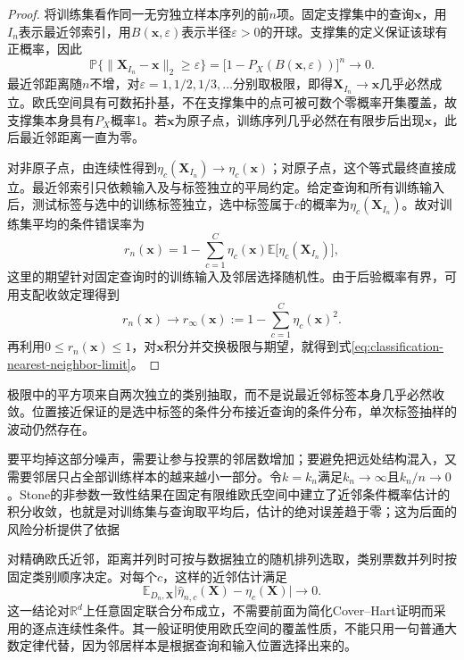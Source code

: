 \begin{proof}
  将训练集看作同一无穷独立样本序列的前$n$项。固定支撑集中的查询$\bm{x}$，用$I_n$表示最近邻索引，用$B(\bm{x},\varepsilon)$表示半径$\varepsilon>0$的开球。支撑集的定义保证该球有正概率，因此
  \[
    \mathbb{P}\{\|\bm{X}_{I_n}-\bm{x}\|_2\geq\varepsilon\}
    =\bigl[1-P_X(B(\bm{x},\varepsilon))\bigr]^n
    \longrightarrow0.
  \]
  最近邻距离随$n$不增，对$\varepsilon=1,1/2,1/3,\ldots$分别取极限，即得$\bm{X}_{I_n}\to\bm{x}$几乎必然成立。欧氏空间具有可数拓扑基，不在支撑集中的点可被可数个零概率开集覆盖，故支撑集本身具有$P_X$概率1。若$\bm{x}$为原子点，训练序列几乎必然在有限步后出现$\bm{x}$，此后最近邻距离一直为零。

  对非原子点，由连续性得到$\eta_c(\bm{X}_{I_n})\to\eta_c(\bm{x})$；对原子点，这个等式最终直接成立。最近邻索引只依赖输入及与标签独立的平局约定。给定查询和所有训练输入后，测试标签与选中的训练标签独立，选中标签属于$c$的概率为$\eta_c(\bm{X}_{I_n})$。故对训练集平均的条件错误率为
  \[
    r_n(\bm{x})
    =1-\sum_{c=1}^{C}\eta_c(\bm{x})
       \mathbb{E}\bigl[\eta_c(\bm{X}_{I_n})\bigr],
  \]
  这里的期望针对固定查询时的训练输入及邻居选择随机性。由于后验概率有界，可用支配收敛定理得到
  \[
    r_n(\bm{x})\longrightarrow
    r_\infty(\bm{x})
    :=1-\sum_{c=1}^{C}\eta_c(\bm{x})^2.
  \]
  再利用$0\leq r_n(\bm{x})\leq1$，对$\bm{x}$积分并交换极限与期望，就得到式\eqref{eq:classification-nearest-neighbor-limit}。
\end{proof}

极限中的平方项来自两次独立的类别抽取，而不是说最近邻标签本身几乎必然收敛。位置接近保证的是选中标签的条件分布接近查询的条件分布，单次标签抽样的波动仍然存在。

要平均掉这部分噪声，需要让参与投票的邻居数增加；要避免把远处结构混入，又需要邻居只占全部训练样本的越来越小一部分。令$k=k_n$满足$k_n\to\infty$且$k_n/n\to0$。Stone的非参数一致性结果在固定有限维欧氏空间中建立了近邻条件概率估计的积分收敛，也就是对训练集与查询取平均后，估计的绝对误差趋于零；这为后面的风险分析提供了依据

对精确欧氏近邻，距离并列时可按与数据独立的随机排列选取，类别票数并列时按固定类别顺序决定。对每个$c$，这样的近邻估计满足
\begin{equation}
  \mathbb{E}_{D_n,\bm{X}}
  \bigl|\hat\eta_{n,c}(\bm{X})-\eta_c(\bm{X})\bigr|
  \longrightarrow0.
  \label{eq:classification-knn-posterior-consistency}
\end{equation}
这一结论对$\mathbb{R}^d$上任意固定联合分布成立，不需要前面为简化Cover--Hart证明而采用的逐点连续性条件。其一般证明使用欧氏空间的覆盖性质，不能只用一句普通大数定律代替，因为邻居样本是根据查询和输入位置选择出来的。

